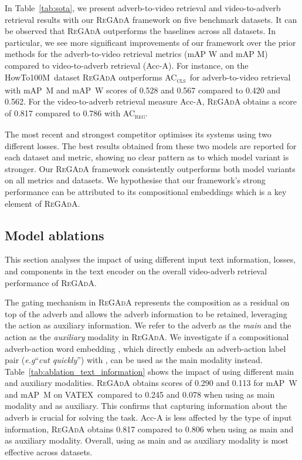 \documentclass[table]{bmvc2k}
\def\eg{\emph{e.g}\bmvaOneDot}
\newcommand{\modelName}{\textsc{ReGAdA}\xspace}
\newcommand{\howto}{HowTo100M}
\newcommand{\vatex}{VATEX}
\newcommand{\accls}{AC\textsubscript{\textsc{cls}}}
\newcommand{\acreg}{AC\textsubscript{\textsc{reg}}}
\begin{document}
In Table~\ref{tab:sota}, we present adverb-to-video retrieval and video-to-adverb retrieval results with our \modelName framework on five benchmark datasets. It can be observed that \modelName outperforms the baselines across all datasets. In particular, we see more significant improvements of our framework over the prior methods for the adverb-to-video retrieval metrics (mAP W and mAP M) compared to video-to-adverb retrieval (Acc-A). 
For instance, on the \howto\ dataset \modelName outperforms \accls\ for adverb-to-video retrieval with mAP~M and mAP~W scores of 0.528 and 0.567 compared to 0.420 and 0.562. For the video-to-adverb retrieval measure Acc-A, \modelName obtains a score of 0.817 compared to 0.786 with \acreg. 

The most recent and strongest competitor \cite{moltisanti2023learning} optimises its systems using two different losses. The best results obtained from these two models are reported for each dataset and metric, showing no clear pattern as to which model variant is stronger.
Our \modelName framework consistently outperforms both model variants~\cite{moltisanti2023learning} on all metrics and datasets. We hypothesise that our framework's strong performance can be attributed to its compositional embeddings which is a key element of \modelName.
 
\subsection{Model ablations} \label{ablations}
This section analyses the impact of using different input text information, losses, and components in the text encoder on the overall video-adverb retrieval performance of \modelName.

The gating mechanism in \modelName represents the composition as a residual on top of the adverb and allows the adverb information to be retained, leveraging the action as auxiliary information.
We refer to the adverb as the \textit{main} and the action as the \textit{auxiliary} modality in \modelName.
We investigate if a compositional adverb-action word embedding , which directly embeds an adverb-action label pair (\eg ``\textit{cut quickly}'') with , can be used as the main modality instead.
Table~\ref{tab:ablation_text_information} shows the impact of using different main and auxiliary modalities. 
\modelName obtains scores of 0.290 and 0.113 for mAP~W and mAP~M on \vatex\, compared to 0.245 and 0.078 when using  as main modality and  as auxiliary.
This confirms that capturing information about the adverb is crucial for solving the task.
Acc-A is less affected by the type of input information, \modelName obtains 0.817 compared to 0.806 when using  as main and  as auxiliary modality. Overall, using  as main and  as auxiliary modality is most effective across datasets. 
\end{document}
